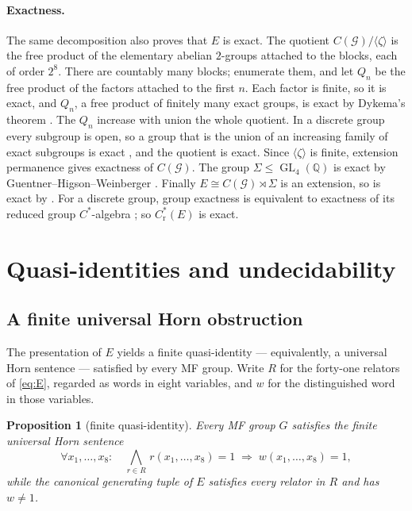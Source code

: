 \documentclass[11pt]{amsart}
\newcommand{\leanverified}[2]{\ignorespaces}
\newtheorem{proposition}[theorem]{Proposition}
\theoremstyle{definition}
\theoremstyle{remark}
\theoremstyle{plain}
\newcommand{\GL}{\operatorname{GL}}
\newcommand{\Cred}{C^*_{\mathrm r}}
\begin{document}
\paragraph{Exactness.}
The same decomposition also proves that $E$ is exact.  The quotient
$C(\mathcal G)/\langle\zeta\rangle$ is the free product of the
elementary abelian $2$-groups attached to the blocks, each of order
$2^{8}$.  There are countably many blocks; enumerate them, and let
$Q_n$ be the free product of the factors attached to the first $n$.
Each factor is finite, so it is exact, and $Q_n$, a free product of
finitely many exact groups, is exact by Dykema's theorem
\cite{DykemaExact}.  The $Q_n$ increase with union the whole quotient.
In a discrete group every subgroup is open, so a group that is the
union of an increasing family of exact subgroups is exact
\cite[Lemma~2.5]{KWExact}, and the quotient is exact.  Since
$\langle\zeta\rangle$ is finite, extension permanence
\cite{KWPermanence} gives exactness of $C(\mathcal G)$.  The group $\Sigma\le\GL_4(\mathbb Q)$ is exact by
Guentner--Higson--Weinberger \cite{GHW}.  Finally
$E\cong C(\mathcal G)\rtimes\Sigma$ is an extension, so is exact by
\cite{KWPermanence}.  For a discrete group, group exactness is
equivalent to exactness of its reduced group $C^*$-algebra
\cite{KWExact}; so $\Cred(E)$ is exact.


\section{Quasi-identities and undecidability}
\label{sec:marked-horn}

\subsection{A finite universal Horn obstruction}

The presentation of $E$ yields a finite quasi-identity ---
equivalently, a universal Horn sentence --- satisfied by every MF
group.  Write $R$ for the forty-one relators of \eqref{eq:E},
regarded as words in eight variables, and $w$ for the distinguished word in those
variables.

\begin{proposition}[finite quasi-identity]\label{prop:horn}
Every MF group $G$ satisfies the finite universal Horn sentence
\[
 \forall x_1,\dots,x_8\colon\quad
 \bigwedge_{r\in R}\,r(x_1,\dots,x_8)=1
 \;\Longrightarrow\; w(x_1,\dots,x_8)=1 ,
\]
while the canonical generating tuple of $E$ satisfies every relator in $R$
and has $w\ne1$.
\leanverified{Sofic/LiteralUniversalHorn}{GroupApproximation.LiteralUniversalHorn.manuscriptLiteralUniversalHorn}
\end{proposition}
\end{document}
